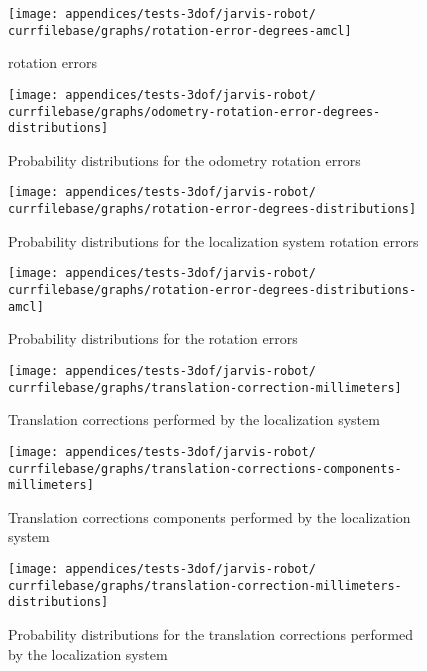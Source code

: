 \begin{figure}[H]
	\centering
	\texttt{[image: appendices/tests-3dof/jarvis-robot/\\currfilebase/graphs/rotation-error-degrees-amcl]}
	\caption{ rotation errors}
\end{figure}


\begin{figure}[H]
	\centering
	\texttt{[image: appendices/tests-3dof/jarvis-robot/\\currfilebase/graphs/odometry-rotation-error-degrees-distributions]}
	\caption{Probability distributions for the odometry rotation errors}
\end{figure}

\begin{figure}[H]
	\centering
	\texttt{[image: appendices/tests-3dof/jarvis-robot/\\currfilebase/graphs/rotation-error-degrees-distributions]}
	\caption{Probability distributions for the localization system rotation errors}
\end{figure}

\begin{figure}[H]
	\centering
	\texttt{[image: appendices/tests-3dof/jarvis-robot/\\currfilebase/graphs/rotation-error-degrees-distributions-amcl]}
	\caption{Probability distributions for the  rotation errors}
\end{figure}


\begin{figure}[H]
	\centering
	\texttt{[image: appendices/tests-3dof/jarvis-robot/\\currfilebase/graphs/translation-correction-millimeters]}
	\caption{Translation corrections performed by the localization system}
\end{figure}

\begin{figure}[H]
	\centering
	\texttt{[image: appendices/tests-3dof/jarvis-robot/\\currfilebase/graphs/translation-corrections-components-millimeters]}
	\caption{Translation corrections components performed by the localization system}
\end{figure}

\begin{figure}[H]
	\centering
	\texttt{[image: appendices/tests-3dof/jarvis-robot/\\currfilebase/graphs/translation-correction-millimeters-distributions]}
	\caption{Probability distributions for the translation corrections performed by the localization system}
\end{figure}


